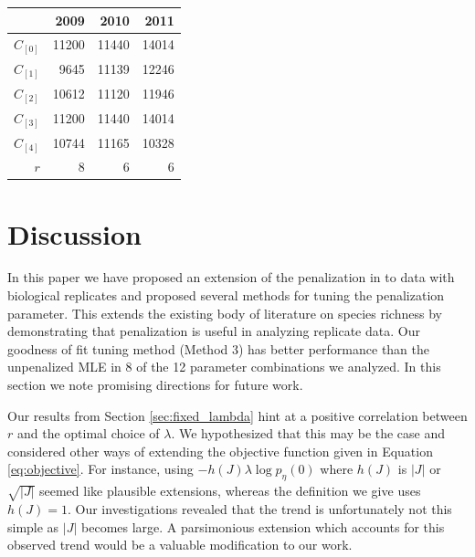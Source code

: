 \documentclass[oupdraft]{bio}
\begin{document}
\begin{table}[h]
\centering
\begin{tabular}{|r|r|r|r|}
  \hline
& 2009  & 2010 & 2011 \\ 
  \hline
$\widehat{C}_{[0]}$ & 11200 & 11440 & 14014 \\ 
  $\widehat{C}_{[1]}$ & 9645 & 11139 & 12246 \\ 
  $\widehat{C}_{[2]}$ & 10612 & 11120 & 11946 \\ 
  $\widehat{C}_{[3]}$ & 11200 & 11440 & 14014 \\ 
  $\widehat{C}_{[4]}$ & 10744 & 11165 & 10328 \\ 
   \hline
     $r$ & 8 & 6 & 6 \\
  \hline
\end{tabular}
\end{table}

\noindent {}



\section{Discussion}
\label{sec:discussion}

In this paper we have proposed an extension of the penalization in \citet{wang_2005} to data with biological replicates and proposed several methods for tuning the penalization parameter.  This extends the existing body of literature on species richness by demonstrating that penalization is useful in analyzing replicate data.  Our goodness of fit tuning method (Method 3) has better performance than the unpenalized MLE in 8 of the 12 parameter combinations we analyzed.  In this section we note promising directions for future work.

Our results from Section \ref{sec:fixed_lambda} hint at a positive correlation between $r$ and the optimal choice of $\lambda$.  We hypothesized that this may be the case and considered other ways of extending the objective function given in Equation \ref{eq:objective}.  For instance, using $-h(J)\lambda \log p_{\eta}(0)$ where $h(J)$ is $|J|$ or $\sqrt{|J|}$ seemed like plausible extensions, whereas the definition we give uses $h(J) = 1$.  Our investigations revealed that the trend is unfortunately not this simple as $|J|$ becomes large.  A parsimonious extension which accounts for this observed trend would be a valuable modification to our work.
\end{document}
